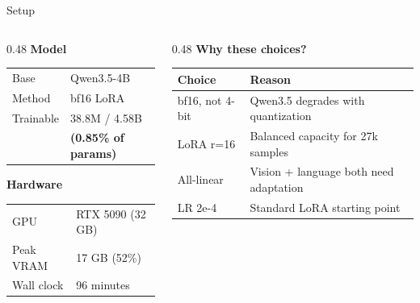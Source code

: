 \documentclass[aspectratio=169, 11pt]{beamer}
\begin{document}
\begin{frame}{Setup}

\begin{columns}[T]
\begin{column}{0.48\textwidth}
    \textbf{Model}\\[0.3em]
    \begin{tabular}{@{}ll@{}}
    Base & Qwen3.5-4B \\
    Method & bf16 LoRA \\
    Trainable & 38.8M / 4.58B \\
    & \textbf{(0.85\% of params)} \\
    \end{tabular}

    \vspace{1em}

    \textbf{Hardware}\\[0.3em]
    \begin{tabular}{@{}ll@{}}
    GPU & RTX 5090 (32 GB) \\
    Peak VRAM & 17 GB (52\%) \\
    Wall clock & 96 minutes \\
    \end{tabular}
\end{column}
\begin{column}{0.48\textwidth}
    \textbf{Why these choices?}\\[0.3em]
    \small
    \begin{tabular}{@{}lp{3.8cm}@{}}
    \toprule
    \textbf{Choice} & \textbf{Reason} \\
    \midrule
    bf16, not 4-bit & Qwen3.5 degrades with quantization \\[0.2em]
    LoRA r=16 & Balanced capacity for 27k samples \\[0.2em]
    All-linear & Vision + language both need adaptation \\[0.2em]
    LR 2e-4 & Standard LoRA starting point \\
    \bottomrule
    \end{tabular}
\end{column}
\end{columns}

\end{frame}
\end{document}
